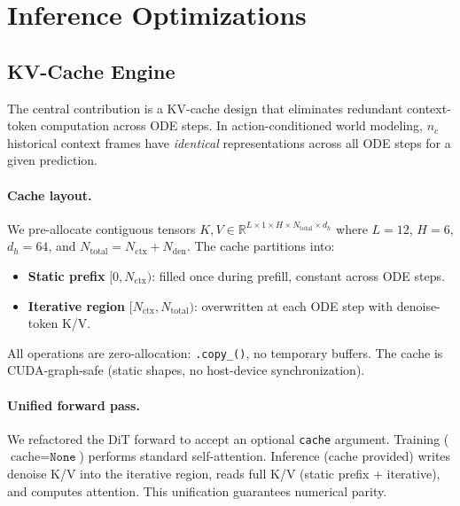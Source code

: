 \documentclass[letterpaper,twocolumn,10pt]{article}
\begin{document}
\section{Inference Optimizations}

\subsection{KV-Cache Engine}

The central contribution is a KV-cache design that eliminates redundant context-token computation across ODE steps.  In action-conditioned world modeling, $n_c$ historical context frames have \emph{identical} representations across all ODE steps for a given prediction.

\paragraph{Cache layout.}
We pre-allocate contiguous tensors $K, V \in \mathbb{R}^{L \times 1
\times H \times N_{\mathrm{total}} \times d_h}$ where $L{=}12$,
$H{=}6$, $d_h{=}64$, and $N_{\mathrm{total}} = N_{\mathrm{ctx}} +
N_{\mathrm{den}}$.  The cache partitions into:
\begin{itemize}
  \item \textbf{Static prefix} $[0, N_{\mathrm{ctx}})$: filled once
        during prefill, constant across ODE steps.
  \item \textbf{Iterative region} $[N_{\mathrm{ctx}}, N_{\mathrm{total}})$:
        overwritten at each ODE step with denoise-token K/V.
\end{itemize}

All operations are zero-allocation: \texttt{.copy\_()}, no temporary buffers.  The cache is CUDA-graph-safe (static shapes, no host-device synchronization).

\paragraph{Unified forward pass.}
We refactored the DiT forward to accept an optional \texttt{cache}
argument.  Training ($\text{cache}{=}\texttt{None}$) performs standard self-attention.  Inference (cache provided) writes denoise K/V into the iterative region, reads full K/V (static prefix + iterative), and computes attention.  This unification guarantees numerical parity.
\end{document}
